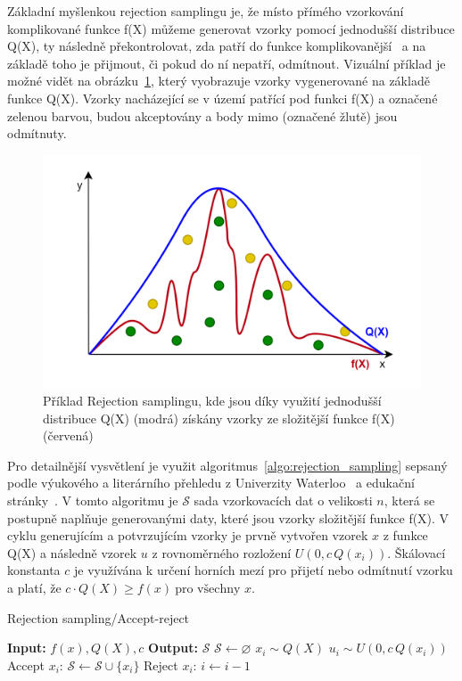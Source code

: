 Základní myšlenkou rejection samplingu je, že místo přímého vzorkování komplikované funkce f(X) můžeme generovat vzorky pomocí jednodušší distribuce Q(X), ty následně překontrolovat, zda patří do funkce komplikovanější~\cite{ghojogh2020sampling} a na základě toho je přijmout, či pokud do ní nepatří, odmítnout. Vizuální příklad je možné vidět na obrázku~\ref{fig:RA_graph}, který vyobrazuje vzorky vygenerované na základě funkce Q(X). Vzorky nacházející se v území patřící pod funkci f(X) a označené zelenou barvou, budou akceptovány a body mimo (označené žlutě) jsou odmítnuty.

\begin{figure}[H]
    \centering
    \includegraphics[width=\textwidth]{obrazky-figures/ch2/RA_graph.png}
    \caption{Příklad Rejection samplingu, kde jsou díky využití jednodušší distribuce Q(X) (modrá) získány vzorky ze složitější funkce f(X) (červená)}
    \label{fig:RA_graph}
\end{figure}

Pro detailnější vysvětlení je využit algoritmus~\ref{algo:rejection_sampling} sepsaný podle výukového a literárního přehledu z Univerzity Waterloo~\cite{ghojogh2020sampling} a edukační stránky~\cite{Sachdeva_2021}. V tomto algoritmu je $\mathcal{S}$ sada vzorkovacích dat o velikosti $n$, která se postupně naplňuje generovanými daty, které jsou vzorky složitější funkce f(X). V cyklu generujícím a potvrzujícím vzorky je prvně vytvořen vzorek $x$ z funkce Q(X) a následně vzorek $u$ z rovnoměrného rozložení $U(0, c\, Q(x_i))$. Škálovací konstanta $c$ je využívána k určení horních mezí pro přijetí nebo odmítnutí vzorku a platí, že $c \cdot Q(X) \geq f(x) \ \text{pro všechny } x$.
\label{eq:RA_c}
\begin{algorithm}[h]
\caption{Rejection sampling/Accept-reject}\label{algo:rejection_sampling}
\begin{algorithmic}[1]
    \State \textbf{Input:} $f(x), Q(X), c$\;
    \State \textbf{Output:} $\mathcal{S}$
    \State $\mathcal{S} \gets \varnothing$
        \State $x_i \sim Q(X)$
        \State $u_i \sim U(0, c\, Q(x_i))$
            \State Accept $x_i$: $\mathcal{S} \gets \mathcal{S} \cup \{x_i\}$
        \Else
            \State Reject $x_i$: $i \gets i - 1$
        \EndIf
    \EndFor
\end{algorithmic}
\end{algorithm}
